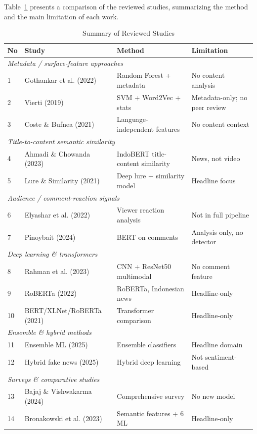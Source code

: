 \documentclass[conference]{IEEEtran}
\begin{document}
Table~\ref{tab:litreview} presents a comparison of the reviewed studies, summarizing the method and the main limitation of each work.
\begin{table}[tp]
\centering
\caption{Summary of Reviewed Studies}
\label{tab:litreview}
\renewcommand{\arraystretch}{1.2}
\begin{tabular}{|p{0.3cm}|p{2.6cm}|p{2.1cm}|p{2.3cm}|}
\hline
\textbf{No} & \textbf{Study} & \textbf{Method} & \textbf{Limitation} \\
\hline
\multicolumn{4}{|l|}{\textit{Metadata / surface-feature approaches}} \\
\hline
1 & Gothankar et al. (2022) & Random Forest + metadata & No content analysis \\
\hline
2 & Vierti (2019) & SVM + Word2Vec + stats & Metadata-only; no peer review \\
\hline
3 & Coste \& Bufnea (2021) & Language-independent features & No content context \\
\hline
\multicolumn{4}{|l|}{\textit{Title-to-content semantic similarity}} \\
\hline
4 & Ahmadi \& Chowanda (2023) & IndoBERT title-content similarity & News, not video \\
\hline
5 & Lure \& Similarity (2021) & Deep lure + similarity model & Headline focus \\
\hline
\multicolumn{4}{|l|}{\textit{Audience / comment-reaction signals}} \\
\hline
6 & Elyashar et al. (2022) & Viewer reaction analysis & Not in full pipeline \\
\hline
7 & Pinoybait (2024) & BERT on comments & Analysis only, no detector \\
\hline
\multicolumn{4}{|l|}{\textit{Deep learning \& transformers}} \\
\hline
8 & Rahman et al. (2023) & CNN + ResNet50 multimodal & No comment feature \\
\hline
9 & RoBERTa (2022) & RoBERTa, Indonesian news & Headline-only \\
\hline
10 & BERT/XLNet/RoBERTa (2021) & Transformer comparison & Headline-only \\
\hline
\multicolumn{4}{|l|}{\textit{Ensemble \& hybrid methods}} \\
\hline
11 & Ensemble ML (2025) & Ensemble classifiers & Headline domain \\
\hline
12 & Hybrid fake news (2025) & Hybrid deep learning & Not sentiment-based \\
\hline
\multicolumn{4}{|l|}{\textit{Surveys \& comparative studies}} \\
\hline
13 & Bajaj \& Vishwakarma (2024) & Comprehensive survey & No new model \\
\hline
14 & Bronakowski et al. (2023) & Semantic features + 6 ML & Headline-only \\
\hline
\end{tabular}
\end{table}
 
\end{document}
